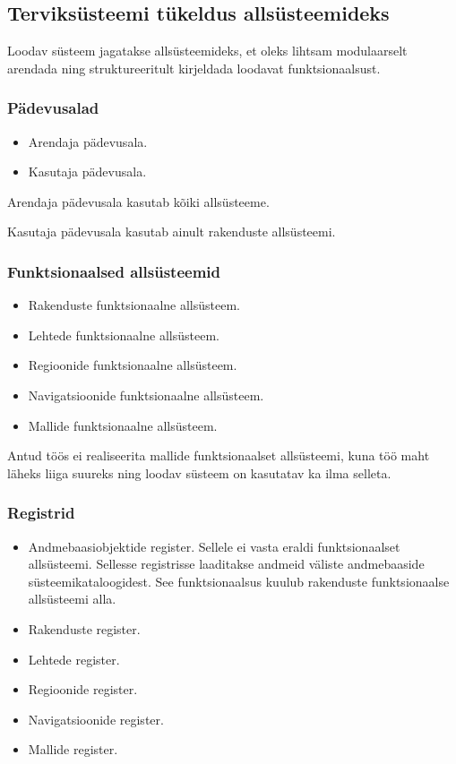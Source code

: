 \documentclass[a4paper,12pt]{article} %
\begin{document}
\subsection{Terviksüsteemi tükeldus allsüsteemideks}
Loodav süsteem jagatakse allsüsteemideks, et oleks lihtsam modulaarselt arendada ning struktureeritult kirjeldada loodavat funktsionaalsust.
\subsubsection{Pädevusalad}
\begin{itemize}
\item Arendaja pädevusala.
\item Kasutaja pädevusala.
\end{itemize}
Arendaja pädevusala kasutab kõiki allsüsteeme.\par
Kasutaja pädevusala kasutab ainult rakenduste allsüsteemi.
\subsubsection{Funktsionaalsed allsüsteemid}
\begin{itemize}
\item Rakenduste funktsionaalne allsüsteem.
\item Lehtede funktsionaalne allsüsteem.
\item Regioonide funktsionaalne allsüsteem.
\item Navigatsioonide funktsionaalne allsüsteem.
\item Mallide funktsionaalne allsüsteem.
\end{itemize}
Antud töös ei realiseerita mallide funktsionaalset allsüsteemi, kuna töö maht läheks liiga suureks ning loodav süsteem on kasutatav ka ilma selleta.
\subsubsection{Registrid}
\begin{itemize}
\item Andmebaasiobjektide register. Sellele ei vasta eraldi funktsionaalset allsüsteemi. Sellesse registrisse laaditakse andmeid väliste andmebaaside süsteemikataloogidest. See funktsionaalsus kuulub rakenduste funktsionaalse allsüsteemi alla.
\item Rakenduste register.
\item Lehtede register.
\item Regioonide register.
\item Navigatsioonide register.
\item Mallide register.
\end{itemize}
\end{document}
